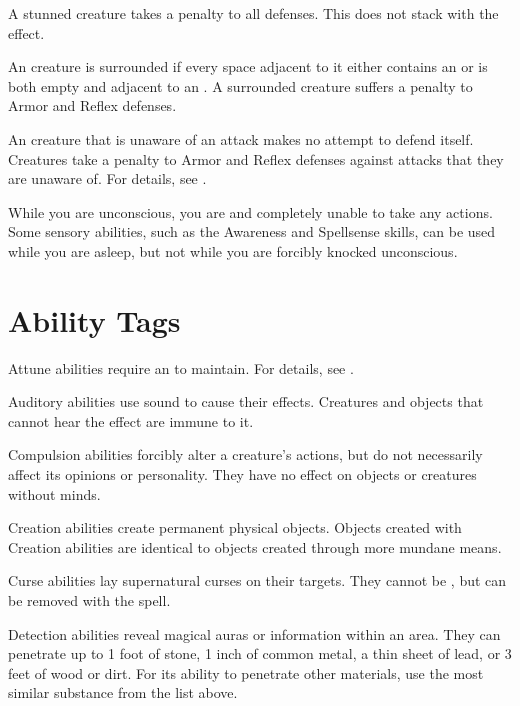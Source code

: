  A stunned creature takes a  penalty to all defenses.
This does not stack with the \dazed effect.

 An creature is surrounded if every space adjacent to it either contains an  or is both empty and adjacent to an .
A surrounded creature suffers a  penalty to Armor and Reflex defenses.

 An creature that is unaware of an attack makes no attempt to defend itself.
Creatures take a  penalty to Armor and Reflex defenses against attacks that they are unaware of.
For details, see .

 While you are unconscious, you are \helpless and completely unable to take any actions.
Some sensory abilities, such as the Awareness and Spellsense skills, can be used while you are asleep, but not while you are forcibly knocked unconscious.

\newpage
\section{Ability Tags}\label{Ability Tags}

 Attune abilities require an  to maintain.
For details, see .

 Auditory abilities use sound to cause their effects.
Creatures and objects that cannot hear the effect are immune to it.

 Compulsion abilities forcibly alter a creature's actions, but do not necessarily affect its opinions or personality.
They have no effect on objects or creatures without minds.

 Creation abilities create permanent physical objects.
Objects created with Creation abilities are identical to objects created through more mundane means.

 Curse abilities lay supernatural curses on their targets.
They cannot be , but can be removed with the  spell.

\label{Detection} Detection abilities reveal magical auras or information within an area.
They can penetrate up to 1 foot of stone, 1 inch of common metal, a thin sheet of lead, or 3 feet of wood or dirt.
For its ability to penetrate other materials, use the most similar substance from the list above.

